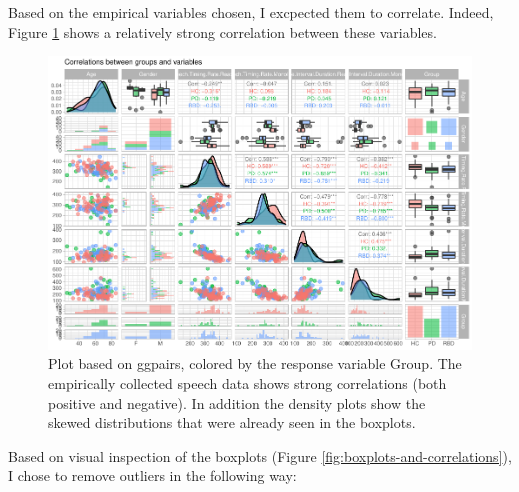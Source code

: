 \documentclass[
  english,
  doc,floatsintext]{apa6}
\newenvironment{Shaded}{\begin{snugshade}}{\end{snugshade}}
\newcommand{\DecValTok}[1]{\textcolor[rgb]{0.00,0.00,0.81}{#1}}
\newcommand{\NormalTok}[1]{#1}
\newcommand{\OtherTok}[1]{\textcolor[rgb]{0.56,0.35,0.01}{#1}}
\newcommand{\SpecialCharTok}[1]{\textcolor[rgb]{0.00,0.00,0.00}{#1}}
\newcommand{\StringTok}[1]{\textcolor[rgb]{0.31,0.60,0.02}{#1}}
\begin{document}
Based on the empirical variables chosen, I excpected them to correlate. Indeed, Figure \ref{fig:correlate-ggpairs-plot} shows
a relatively strong correlation between these variables.

\begin{figure}

{\centering \includegraphics{dap_report_anja_probst_files/figure-latex/correlate-ggpairs-plot-1} 

}

\caption{Plot based on ggpairs, colored by the response variable Group. The empirically collected speech data shows strong correlations (both positive and negative). In addition the density plots show the skewed distributions that were already seen in the boxplots.}\label{fig:correlate-ggpairs-plot}
\end{figure}

Based on visual inspection of the boxplots (Figure \ref{fig:boxplots-and-correlations}), I chose to remove outliers
in the following way:

\begin{Shaded}
\end{Shaded}
\end{document}
